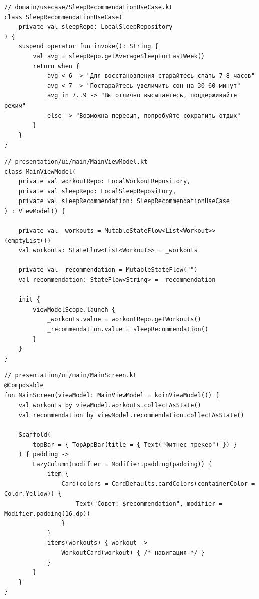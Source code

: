 \begin{lstlisting}[caption={Use case (доменная логика)}]
// domain/usecase/SleepRecommendationUseCase.kt
class SleepRecommendationUseCase(
    private val sleepRepo: LocalSleepRepository
) {
    suspend operator fun invoke(): String {
        val avg = sleepRepo.getAverageSleepForLastWeek()
        return when {
            avg < 6 -> "Для восстановления старайтесь спать 7–8 часов"
            avg < 7 -> "Постарайтесь увеличить сон на 30–60 минут"
            avg in 7..9 -> "Вы отлично высыпаетесь, поддерживайте режим"
            else -> "Возможна пересып, попробуйте сократить отдых"
        }
    }
}
\end{lstlisting}

\begin{lstlisting}[caption={ViewModel (presentation)}]
// presentation/ui/main/MainViewModel.kt
class MainViewModel(
    private val workoutRepo: LocalWorkoutRepository,
    private val sleepRepo: LocalSleepRepository,
    private val sleepRecommendation: SleepRecommendationUseCase
) : ViewModel() {

    private val _workouts = MutableStateFlow<List<Workout>>(emptyList())
    val workouts: StateFlow<List<Workout>> = _workouts

    private val _recommendation = MutableStateFlow("")
    val recommendation: StateFlow<String> = _recommendation

    init {
        viewModelScope.launch {
            _workouts.value = workoutRepo.getWorkouts()
            _recommendation.value = sleepRecommendation()
        }
    }
}
\end{lstlisting}

\begin{lstlisting}[caption={Compose экран (presentation)}]
// presentation/ui/main/MainScreen.kt
@Composable
fun MainScreen(viewModel: MainViewModel = koinViewModel()) {
    val workouts by viewModel.workouts.collectAsState()
    val recommendation by viewModel.recommendation.collectAsState()

    Scaffold(
        topBar = { TopAppBar(title = { Text("Фитнес-трекер") }) }
    ) { padding ->
        LazyColumn(modifier = Modifier.padding(padding)) {
            item {
                Card(colors = CardDefaults.cardColors(containerColor = Color.Yellow)) {
                    Text("Совет: $recommendation", modifier = Modifier.padding(16.dp))
                }
            }
            items(workouts) { workout ->
                WorkoutCard(workout) { /* навигация */ }
            }
        }
    }
}
\end{lstlisting}

